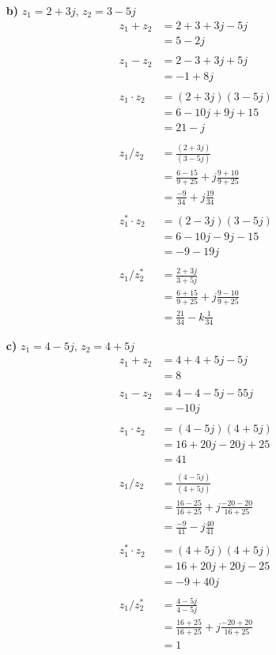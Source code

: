 \documentclass[a4paper,11pt]{article}
\begin{document}
\begin{enumerate}
\begin{enumerate}
\begin{enumerate}
			\item[\textbf{b)}] $z_1 = 2+3j \text{, } z_2=3-5j$			
			\begin{align*}
			z_1+z_2 &= 2+3+3j-5j \\
					&= 5-2j \\\\
			z_1-z_2 &= 2-3+3j+5j \\
					&= -1+8j \\\\
			z_1 \cdot z_2 &= (2+3j)(3-5j) \\
			              &= 6-10j+9j+15 \\
			              &= 21-j \\\\
			z_1 / z_2 &= \frac{(2+3j)}{(3-5j)} \\
			          &= \frac{6-15}{9+25}+j\frac{9+10}{9+25} \\
			          &= \frac{-9}{34}+j\frac{19}{34} \\\\
			z_1^* \cdot z_2 &= (2-3j)(3-5j) \\
			              	&= 6-10j-9j-15 \\
			              	&= -9-19j \\\\
			z_1 / z_2^* &= \frac{2+3j}{3+5j}\\
						&= \frac{6+15}{9+25} + j\frac{9-10}{9+25} \\
						&= \frac{21}{34}-k\frac{1}{34}
			\end{align*}
			
			\item[\textbf{c)}] $z_1 = 4-5j \text{, } z_2=4+5j$
			\begin{align*}
			z_1+z_2 &= 4+4+5j-5j \\
					&= 8 \\\\
			z_1-z_2 &= 4-4-5j-55j \\
					&= -10j \\\\
			z_1 \cdot z_2 &= (4-5j)(4+5j) \\
			              &= 16+20j-20j+25 \\
			              &= 41 \\\\
			z_1 / z_2 &= \frac{(4-5j)}{(4+5j)} \\
			          &= \frac{16-25}{16+25}+j\frac{-20-20}{16+25} \\
			          &= \frac{-9}{41}-j\frac{40}{41} \\\\
			z_1^* \cdot z_2 &= (4+5j)(4+5j) \\
			              	&= 16+20j+20j-25 \\
			              	&= -9+40j \\\\
			z_1 / z_2^* &= \frac{4-5j}{4-5j}\\
						&= \frac{16+25}{16+25} + j\frac{-20+20}{16+25} \\
						&= 1
			\end{align*}
			

\end{enumerate}
\end{enumerate}
\end{enumerate}
\end{document}

